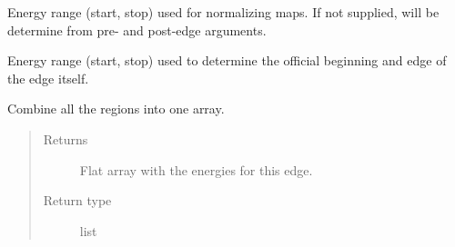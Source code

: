 \documentclass[letterpaper,10pt,english]{sphinxmanual}
\begin{document}
\begin{fulllineitems}
\begin{fulllineitems}
\end{fulllineitems}


\begin{fulllineitems}
\label{\detokenize{xanespy:xanespy.edges.Edge.map_range}}
 \textendash{} Energy range (start, stop) used for normalizing maps. If not
supplied, will be determine from pre- and post-edge arguments.

\end{fulllineitems}


\begin{fulllineitems}
\label{\detokenize{xanespy:xanespy.edges.Edge.edge_range}}
 \textendash{} Energy range (start, stop) used to determine the official
beginning and edge of the edge itself.

\end{fulllineitems}


\begin{fulllineitems}
\end{fulllineitems}


\begin{fulllineitems}
\label{\detokenize{xanespy:xanespy.edges.Edge.all_energies}}
Combine all the regions into one array.
\begin{quote}\begin{description}
\item[{Returns}] \leavevmode
{} \textendash{} Flat array with the energies for this edge.

\item[{Return type}] \leavevmode
list

\end{description}\end{quote}

\end{fulllineitems}



\end{fulllineitems}
\end{document}
